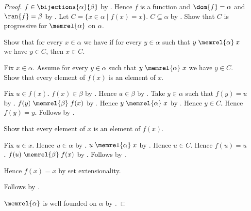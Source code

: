 \begin{proof}
    $f\in\bijections{\alpha}{\beta}$
        by .
    Hence $f$ is a function and $\dom{f}=\alpha$ and $\ran{f}=\beta$
        by
        .
    Let $C=\{x\in\alpha\mid f(x)=x\}$.
    $C\subseteq\alpha$ by .
    Show that $C$ is progressive for $\memrel{\alpha}$ on $\alpha$.
    \begin{subproof}
        Show that for every $x\in\alpha$ we have if for every
            $y\in\alpha$ such that
            $y\mathrel{\memrel{\alpha}}x$ we have $y\in C$, then
            $x\in C$.
        \begin{subproof}
            Fix $x\in\alpha$.
            Assume for every $y\in\alpha$ such that
                $y\mathrel{\memrel{\alpha}}x$ we have $y\in C$.
            Show that every element of $f(x)$ is an element of $x$.
            \begin{subproof}
                Fix $u\in f(x)$.
                $f(x)\in\beta$ by .
                Hence $u\in\beta$
                    by .
                Take $y\in\alpha$ such that $f(y)=u$
                    by .
                $f(y)\mathrel{\memrel{\beta}}f(x)$
                    by .
                Hence $y\mathrel{\memrel{\alpha}}x$
                    by .
                Hence $y\in C$.
                Hence $f(y)=y$.
                Follows by .
            \end{subproof}
            Show that every element of $x$ is an element of $f(x)$.
            \begin{subproof}
                Fix $u\in x$.
                Hence $u\in\alpha$
                    by .
                $u\mathrel{\memrel{\alpha}}x$
                    by .
                Hence $u\in C$.
                Hence $f(u)=u$.
                $f(u)\mathrel{\memrel{\beta}}f(x)$
                    by .
                Follows by .
            \end{subproof}
            Hence $f(x)=x$ by set extensionality.
        \end{subproof}
        Follows by .
    \end{subproof}
    $\memrel{\alpha}$ is well-founded on $\alpha$
        by .

\end{proof}
